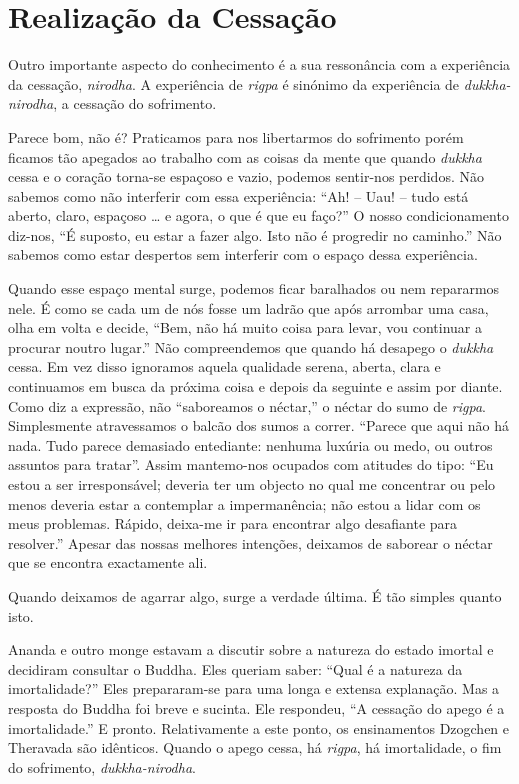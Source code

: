 \section{Realização da Cessação}

Outro importante aspecto do conhecimento é a sua ressonância com a
experiência da cessação, \emph{nirodha}. A experiência de \emph{rigpa} é
sinónimo da experiência de \emph{dukkha-nirodha}, a cessação do
sofrimento.

Parece bom, não é? Praticamos para nos libertarmos do sofrimento porém
ficamos tão apegados ao trabalho com as coisas da mente que
quando \emph{dukkha} cessa e o coração torna-se espaçoso e vazio,
podemos sentir-nos perdidos. Não sabemos como não interferir com essa
experiência: ``Ah! -- Uau! -- tudo está aberto, claro, espaçoso \ldots{}
e agora, o que é que eu faço?'' O nosso condicionamento diz-nos, ``É
suposto, eu estar a fazer algo. Isto não é progredir no caminho.'' Não
sabemos como estar despertos sem interferir com o espaço dessa
experiência.

Quando esse espaço mental surge, podemos ficar baralhados ou nem
repararmos nele. É como se cada um de nós fosse um ladrão que após
arrombar uma casa, olha em volta e decide, ``Bem, não há muito coisa
para levar, vou continuar a procurar noutro lugar.'' Não compreendemos
que quando há desapego o \emph{dukkha} cessa. Em vez disso ignoramos
aquela qualidade serena, aberta, clara e continuamos em busca da próxima
coisa e depois da seguinte e assim por diante. Como diz a expressão, não
``saboreamos o néctar,'' o néctar do sumo de \emph{rigpa}. Simplesmente
atravessamos o balcão dos sumos a correr. ``Parece que aqui não há nada.
Tudo parece demasiado entediante: nenhuma luxúria ou medo, ou outros
assuntos para tratar''. Assim mantemo-nos ocupados com atitudes do tipo:
``Eu estou a ser irresponsável; deveria ter um objecto no qual me
concentrar ou pelo menos deveria estar a contemplar a impermanência; não
estou a lidar com os meus problemas. Rápido, deixa-me ir para encontrar
algo desafiante para resolver.'' Apesar das nossas melhores intenções,
deixamos de saborear o néctar que se encontra exactamente ali.

Quando deixamos de agarrar algo, surge a verdade última. É tão simples
quanto isto.

Ananda e outro monge estavam a discutir sobre a natureza do estado
imortal e decidiram consultar o Buddha. Eles queriam saber: ``Qual é a
natureza da imortalidade?'' Eles prepararam-se para uma longa e extensa
explanação. Mas a resposta do Buddha foi breve e sucinta. Ele respondeu,
``A cessação do apego é a imortalidade.'' E pronto. Relativamente a este
ponto, os ensinamentos Dzogchen e Theravada são idênticos. Quando o
apego cessa, há \emph{rigpa}, há imortalidade, o fim do sofrimento,
\emph{dukkha-nirodha}.

